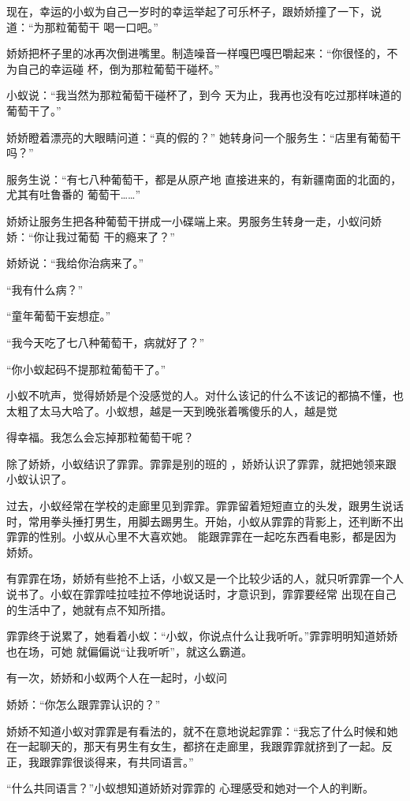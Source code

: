 \documentclass{article}
\begin{document}
现在，幸运的小蚁为自己一岁时的幸运举起了可乐杯子，跟娇娇撞了一下，说道：“为那粒葡萄干
喝一口吧。” 

娇娇把杯子里的冰再次倒进嘴里。制造噪音一样嘎巴嘎巴嚼起来：“你很怪的，不为自己的幸运碰
杯，倒为那粒葡萄干碰杯。” 

小蚁说：“我当然为那粒葡萄干碰杯了，到今
天为止，我再也没有吃过那样味道的葡萄干了。” 

娇娇瞪着漂亮的大眼睛问道：“真的假的？”
她转身问一个服务生：“店里有葡萄干吗？” 

服务生说：“有七八种葡萄干，都是从原产地
\newpage
直接进来的，有新疆南面的北面的，尤其有吐鲁番的
葡萄干……” 

娇娇让服务生把各种葡萄干拼成一小碟端上来。男服务生转身一走，小蚁问娇娇：“你让我过葡萄
干的瘾来了？” 


娇娇说：“我给你治病来了。” 


“我有什么病？” 


“童年葡萄干妄想症。” 


“我今天吃了七八种葡萄干，病就好了？” 


“你小蚁起码不提那粒葡萄干了。” 

小蚁不吭声，觉得娇娇是个没感觉的人。对什么该记的什么不该记的都搞不懂，也太粗了太马大哈了。小蚁想，越是一天到晚张着嘴傻乐的人，越是觉

\newpage
得幸福。我怎么会忘掉那粒葡萄干呢？ 

除了娇娇，小蚁结识了霏霏。霏霏是别的班的
，娇娇认识了霏霏，就把她领来跟小蚁认识了。 

过去，小蚁经常在学校的走廊里见到霏霏。霏霏留着短短直立的头发，跟男生说话时，常用拳头捶打男生，用脚去踢男生。开始，小蚁从霏霏的背影上，还判断不出霏霏的性别。小蚁从心里不大喜欢她。
能跟霏霏在一起吃东西看电影，都是因为娇娇。 

有霏霏在场，娇娇有些抢不上话，小蚁又是一个比较少话的人，就只听霏霏一个人说书了。小蚁在霏霏哇拉哇拉不停地说话时，才意识到，霏霏要经常
出现在自己的生活中了，她就有点不知所措。 

霏霏终于说累了，她看着小蚁：“小蚁，你说点什么让我听听。”霏霏明明知道娇娇也在场，可她
就偏偏说“让我听听”，就这么霸道。 

有一次，娇娇和小蚁两个人在一起时，小蚁问

\newpage
娇娇：“你怎么跟霏霏认识的？” 

娇娇不知道小蚁对霏霏是有看法的，就不在意地说起霏霏：“我忘了什么时候和她在一起聊天的，那天有男生有女生，都挤在走廊里，我跟霏霏就挤到了一起。反正，我跟霏霏很谈得来，有共同语言。”

“什么共同语言？”小蚁想知道娇娇对霏霏的
心理感受和她对一个人的判断。 
\end{document}
